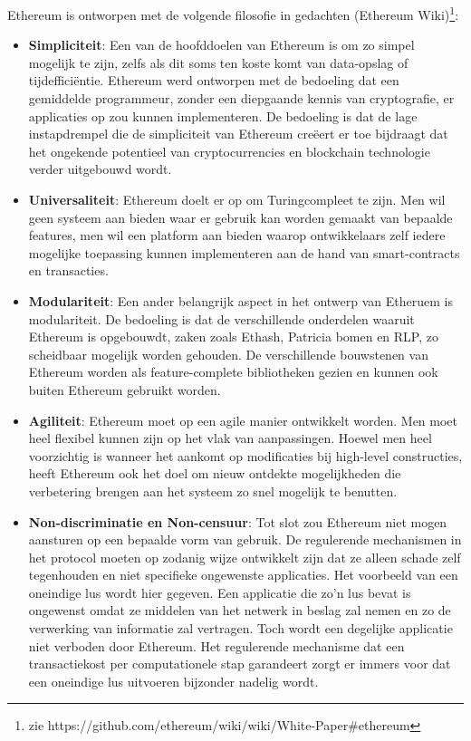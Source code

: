 			Ethereum is ontworpen met de volgende filosofie in gedachten (Ethereum Wiki)\footnote{zie https://github.com/ethereum/wiki/wiki/White-Paper\#ethereum}:
			\begin{itemize}
				\setlength\itemsep{1em}
				\item \textbf{Simpliciteit}: 
				Een van de hoofddoelen van Ethereum is om zo simpel mogelijk te zijn, zelfs als dit soms ten koste komt van data-opslag of tijdefficiëntie. Ethereum werd ontworpen met de bedoeling dat een gemiddelde programmeur, zonder een diepgaande kennis van cryptografie, er applicaties op zou kunnen implementeren. De bedoeling is dat de lage instapdrempel die de simpliciteit van Ethereum creëert er toe bijdraagt dat het ongekende potentieel van cryptocurrencies en blockchain technologie verder uitgebouwd wordt.
				\item \textbf{Universaliteit}: Ethereum doelt er op om Turingcompleet te zijn. Men wil  geen systeem aan bieden waar er gebruik kan worden gemaakt van bepaalde features, men wil een platform aan bieden waarop ontwikkelaars zelf iedere mogelijke toepassing kunnen implementeren aan de hand van smart-contracts en transacties.
				\item \textbf{Modulariteit}: 
				Een ander belangrijk aspect in het ontwerp van Etheruem is modulariteit. De bedoeling is dat de verschillende onderdelen waaruit Ethereum is opgebouwdt, zaken zoals Ethash, Patricia bomen en RLP, zo scheidbaar mogelijk worden gehouden. De verschillende bouwstenen van Ethereum worden als feature-complete bibliotheken gezien en kunnen ook buiten Ethereum gebruikt worden.
				\item \textbf{Agiliteit}: 
				Ethereum moet op een agile manier ontwikkelt worden. Men moet heel flexibel kunnen zijn op het vlak van aanpassingen. Hoewel men heel voorzichtig is wanneer het aankomt op modificaties bij high-level constructies, heeft Ethereum ook het doel om nieuw ontdekte mogelijkheden die verbetering brengen aan het systeem zo snel mogelijk te benutten.
				\item \textbf{Non-discriminatie en Non-censuur}: 
				Tot slot zou Ethereum niet mogen aansturen op een bepaalde vorm van gebruik. De regulerende mechanismen in het protocol moeten op zodanig wijze ontwikkelt zijn dat ze alleen schade zelf tegenhouden en niet specifieke ongewenste applicaties. Het voorbeeld van een oneindige lus wordt hier gegeven. Een applicatie die zo'n lus bevat is  ongewenst omdat ze middelen van het netwerk in beslag zal nemen en zo de verwerking van informatie zal vertragen. Toch wordt een degelijke applicatie niet verboden door Ethereum. Het regulerende mechanisme dat een transactiekost per computationele stap garandeert zorgt er immers voor dat een oneindige lus uitvoeren bijzonder nadelig wordt.
			\end{itemize}
